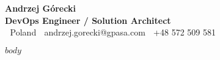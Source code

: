 \documentclass[a4paper,10pt]{article}
\begin{document}
\begin{center}
    {\Huge \textbf{Andrzej Górecki}} \\
    \vspace{0.2cm}
    \textbf{DevOps Engineer / Solution Architect} \\
    \vspace{0.1cm}
    📍 Poland \quad 📧 andrzej.gorecki@gpasa.com \quad 📱 +48 572 509 581 \\
    
\end{center}

\vspace{1.0cm}

\begin{multicols}{2}
$body$
\end{multicols}
\end{document}
